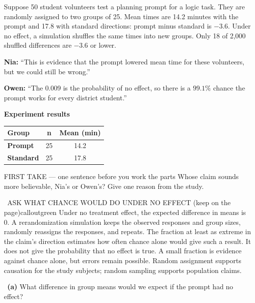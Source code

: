 \documentclass[11pt]{article}
\begin{document}
Suppose 50 student volunteers test a planning prompt for a logic task. They are randomly assigned to two groups of 25. Mean times are 14.2 minutes with the prompt and 17.8 with standard directions: prompt minus standard is $-3.6$. Under no effect, a simulation shuffles the same times into new groups. Only 18 of 2{,}000 shuffled differences are $-3.6$ or lower.\par\smallskip \textbf{Nia:} ``This is evidence that the prompt lowered mean time for these volunteers, but we could still be wrong.''\par \textbf{Owen:} ``The $0.009$ is the probability of no effect, so there is a $99.1\%$ chance the prompt works for every district student.''\par
\begin{center}
\textbf{Experiment results}\par\smallskip
\begin{tabular}{|l|c|c|}
\hline
\textbf{Group} & \textbf{n} & \textbf{Mean (min)} \\ \hline
\textbf{Prompt} & 25 & 14.2 \\ \hline
\textbf{Standard} & 25 & 17.8 \\ \hline
\end{tabular}
\end{center}
\begin{firsttakebox}{FIRST TAKE --- one sentence before you work the parts}
Whose claim sounds more believable, Nia's or Owen's? Give one reason from the study.\par
{}
\end{firsttakebox}

\begin{callout}{\IconBook\ ASK WHAT CHANCE WOULD DO UNDER NO EFFECT (keep on the page)}{calloutgreen}
Under no treatment effect, the expected difference in means is 0. A rerandomization simulation
keeps the observed responses and group sizes, randomly reassigns the responses, and repeats.
The fraction at least as extreme in the claim's direction estimates how often chance alone
would give such a result. It does not give the probability that no effect is true.
A small fraction is evidence against chance alone, but errors remain possible.
Random assignment supports causation for the study subjects; random sampling supports population claims.
\end{callout}

~\textbf{(a)} What difference in group means would we expect if the prompt had no effect?\par
{}
\end{document}
